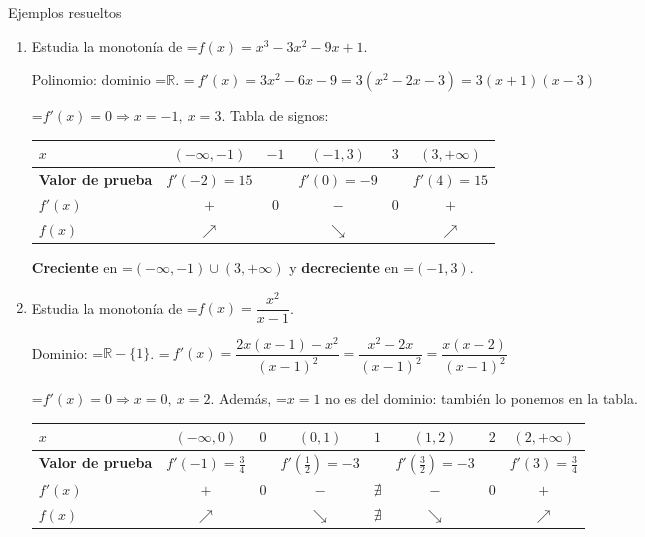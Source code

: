 \documentclass[11pt,a4paper]{article}
\newcommand{\fmm}[1]{\setbox0=\hbox{$#1$}\ifdim\wd0>\linewidth\[#1\]\else\mbox{\box0}\fi}
\begin{document}
  
\begin{fmex}{Ejemplos resueltos}
\begin{enumerate}[label=\textbf{\arabic*.},leftmargin=*]
\item Estudia la monotonía de \fmm{f(x)=x^3-3x^2-9x+1}.
          

            

Polinomio: dominio \fmm{\mathbb R}. \fmm{\ f'(x)=3x^2-6x-9=3(x^2-2x-3)=3(x+1)(x-3)}

            

\fmm{f'(x)=0\Rightarrow x=-1,\ x=3}. Tabla de signos:

              
\begin{center}\small\renewcommand{\arraystretch}{1.6}\begin{tabular}{l|ccccc}\toprule
\textbf{$x$} & $(-\infty,-1)$ & $-1$ & $(-1,3)$ & $3$ & $(3,+\infty)$\\\midrule
\textbf{Valor de prueba} & $f'(-2)=15$ &  & $f'(0)=-9$ &  & $f'(4)=15$\\\midrule
\textbf{$f'(x)$} & \textbf{\color{fmok}$+$} & 0 & \textbf{\color{fmas}$-$} & 0 & \textbf{\color{fmok}$+$}\\\midrule
\textbf{$f(x)$} & {\Large\color{fmok}$\nearrow$} &  & {\Large\color{fmas}$\searrow$} &  & {\Large\color{fmok}$\nearrow$}\\
\bottomrule\end{tabular}\end{center}

            

\textbf{Creciente} en \fmm{(-\infty,-1)\cup(3,+\infty)} y \textbf{decreciente} en \fmm{(-1,3)}.
\item Estudia la monotonía de \fmm{f(x)=\dfrac{x^2}{x-1}}.
          

            

Dominio: \fmm{\mathbb R-\{1\}}. \fmm{\ f'(x)=\dfrac{2x(x-1)-x^2}{(x-1)^2}=\dfrac{x^2-2x}{(x-1)^2}=\dfrac{x(x-2)}{(x-1)^2}}

            

\fmm{f'(x)=0\Rightarrow x=0,\ x=2}. Además, \fmm{x=1} no es del dominio: también lo ponemos en la tabla.

              
\begin{center}\small\renewcommand{\arraystretch}{1.6}\begin{tabular}{l|ccccccc}\toprule
\textbf{$x$} & $(-\infty,0)$ & $0$ & $(0,1)$ & $1$ & $(1,2)$ & $2$ & $(2,+\infty)$\\\midrule
\textbf{Valor de prueba} & $f'(-1)=\frac34$ &  & $f'(\frac12)=-3$ &  & $f'(\frac32)=-3$ &  & $f'(3)=\frac34$\\\midrule
\textbf{$f'(x)$} & \textbf{\color{fmok}$+$} & 0 & \textbf{\color{fmas}$-$} & $\nexists$ & \textbf{\color{fmas}$-$} & 0 & \textbf{\color{fmok}$+$}\\\midrule
\textbf{$f(x)$} & {\Large\color{fmok}$\nearrow$} &  & {\Large\color{fmas}$\searrow$} & $\nexists$ & {\Large\color{fmas}$\searrow$} &  & {\Large\color{fmok}$\nearrow$}\\
\bottomrule\end{tabular}\end{center}


\end{enumerate}
\end{fmex}
\end{document}
